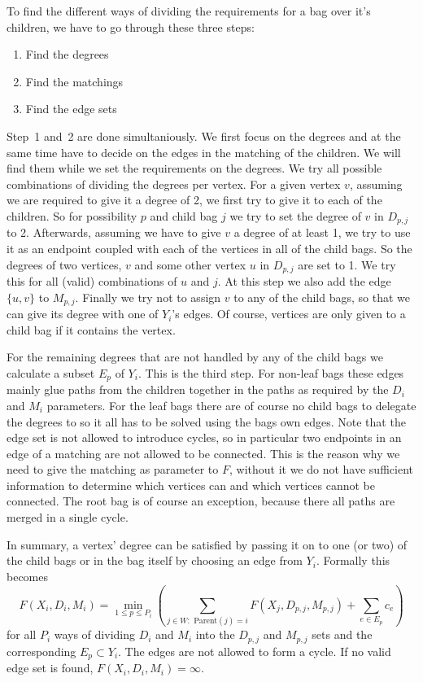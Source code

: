 \documentclass[titlepage, 12pt]{article}
\begin{document}
    To find the different ways of dividing the requirements for a bag over it's children, we have to
    go through these three steps:
    \begin{enumerate}
        \item Find the degrees
        \item Find the matchings
        \item Find the edge sets
    \end{enumerate}
    Step~1 and~2 are done simultaniously. We first focus on the degrees and at the same time have
    to decide on the edges in the matching of the children. We will find them while we set the
    requirements on the degrees.
    We try all possible combinations of dividing the degrees per vertex. For a given vertex $v$,
    assuming we are required to give it a degree of 2, we first try to give it to each of the
    children. So for possibility $p$ and child bag $j$ we try to set the degree of $v$ in $D_{p,j}$
    to 2. Afterwards, assuming we have to give $v$ a degree of at least 1, we try to use it as an
    endpoint coupled with each of the vertices in all of the child bags. So the degrees of two
    vertices, $v$ and some other vertex $u$ in $D_{p,j}$ are set to 1. We try this for all (valid)
    combinations of $u$ and $j$. At this step we also add the edge $\{u, v\}$ to $M_{p,j}$. Finally
    we try not to assign $v$ to any of the child bags, so that we can give its degree with one of
    $Y_i$'s edges.
    Of course, vertices are only given to a child bag if it contains the vertex.

    For the remaining degrees that are not handled by any of the child bags we calculate a subset
    $E_p$ of $Y_i$. This is the third step. For non-leaf bags these edges mainly glue paths from the
    children together in the paths as required by the $D_i$ and $M_i$ parameters. For the leaf bags
    there are of course no child bags to delegate the degrees to so it all has to be solved using
    the bags own edges.
    Note that the edge set is not allowed to introduce cycles, so in particular two endpoints in an
    edge of a matching are not allowed to be connected. This is the reason why we need to give the
    matching as parameter to $F$, without it we do not have sufficient information to determine
    which vertices can and which vertices cannot be connected. The root bag is of course an
    exception, because there all paths are merged in a single cycle.

    In summary, a vertex' degree can be satisfied by passing it on to one (or two) of the child bags
    or in the bag itself by choosing an edge from $Y_i$. Formally this becomes
    \[
        F(X_i, D_i, M_i) = \min_{1 \leq p \leq P_i} (
            \sum_{j \in W :\text{\ Parent}(j) = i} F(X_j, D_{p,j}, M_{p,j}) + \sum_{e \in E_p} c_e
        )
    \]
    for all $P_i$ ways of dividing $D_i$ and $M_i$ into the $D_{p,j}$ and $M_{p,j}$ sets and the
    corresponding $E_p \subset Y_i$. The edges are not allowed to form a cycle.
    If no valid edge set is found, $F(X_i, D_i, M_i) = \infty$.
\end{document}
